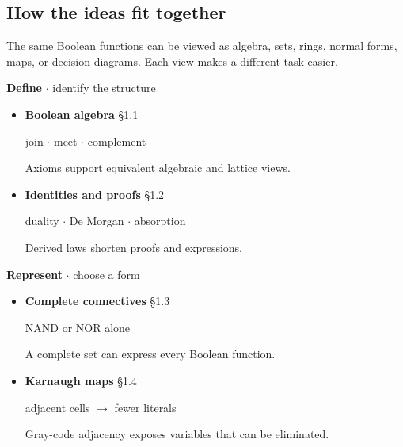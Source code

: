 \documentclass[11pt]{article}
\begin{document}
\begin{keepsection}
\section{How the ideas fit together}

The same Boolean functions can be viewed as algebra, sets, rings, normal forms, maps, or decision diagrams. Each view makes a different task easier.

\textbf{Define} \ensuremath{\cdot} identify the structure

\begin{itemize}
\item 
{}
\textbf{Boolean algebra} \hfill{\small\color{FAUblue}§1.1}

join \ensuremath{\cdot} meet \ensuremath{\cdot} complement

Axioms support equivalent algebraic and lattice views.

\item 
{}
\textbf{Identities and proofs} \hfill{\small\color{FAUblue}§1.2}

duality \ensuremath{\cdot} De Morgan \ensuremath{\cdot} absorption

Derived laws shorten proofs and expressions.

\end{itemize}

\textbf{Represent} \ensuremath{\cdot} choose a form

\begin{itemize}
\item 
{}
\textbf{Complete connectives} \hfill{\small\color{FAUblue}§1.3}

NAND or NOR alone

A complete set can express every Boolean function.

\item 
{}
\textbf{Karnaugh maps} \hfill{\small\color{FAUblue}§1.4}

adjacent cells \ensuremath{\to} fewer literals

Gray-code adjacency exposes variables that can be eliminated.

\end{itemize}


\end{keepsection}
\end{document}
